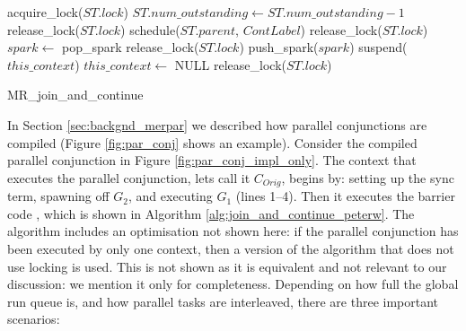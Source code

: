 \begin{algorithm}
\begin{algorithmic}
  \State acquire\_lock($ST.lock$)
  \State $ST.num\_outstanding \gets ST.num\_outstanding - 1$
      \State release\_lock($ST.lock$)
    \Else
      \State schedule($ST.parent$, $ContLabel$)
      \State release\_lock($ST.lock$)
    \EndIf
  \Else
    \State $spark \gets$ pop\_spark
        \State release\_lock($ST.lock$)
      \EndIf
      \State push\_spark($spark$)
    \EndIf
       \State suspend($this\_context$)
       \State $this\_context \gets$ NULL
    \EndIf
    \State release\_lock($ST.lock$)
  \EndIf
\EndProcedure
\end{algorithmic}
\caption{MR\_join\_and\_continue}
\label{alg:join_and_continue_peterw}
\end{algorithm}

In Section \ref{sec:backgnd_merpar} we described how parallel
conjunctions are compiled
(Figure \ref{fig:par_conj} shows an example).
Consider the compiled parallel conjunction in Figure
\ref{fig:par_conj_impl_only}.
The context that executes the parallel conjunction,
lets call it $C_{Orig}$,
begins by:
setting up the sync term,
spawning off $G_2$,
and executing $G_1$ (lines 1--4).
Then it executes the barrier code
\joinandcontinue, which is shown in
Algorithm \ref{alg:join_and_continue_peterw}.
The algorithm includes an optimisation not shown here:
if the parallel conjunction has been executed by only one context,
then a version of the algorithm that does not use locking is used.
This is not shown as it is equivalent and not relevant to
our discussion:
we mention it only for completeness.
Depending on how full the global run queue is,
and how parallel tasks are interleaved,
there are three important scenarios:

